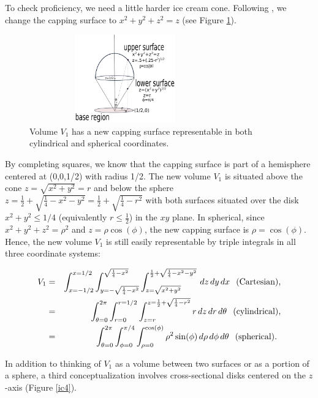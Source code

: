 \documentclass[12pt,fleqn]{article}
\begin{document}
To check proficiency, we need a little harder ice cream cone. Following  \cite{S}, we change the capping surface  to $x^2+y^2+z^2=z$ (see Figure \ref{ic3}).  


\begin{figure}[h]
    \centering
        \includegraphics [width=3.25in, height=1.5in]{ic3.eps}
    \caption{Volume $V_1$ has a new capping surface representable in both cylindrical and spherical coordinates.}
    \label{ic3}
\end{figure}

{\flushleft By} completing squares, we know that the capping surface  is part of a hemisphere centered at (0,0,1/2) with radius 1/2. 
The new volume $V_1$ is situated above the cone  $z=\sqrt{x^2+y^2}=r$ and below the sphere $z=\frac {1}{2}+\sqrt{\frac{1}{4}-x^2-y^2}=\frac{1}{2}+\sqrt{\frac{1}{4}-r^2}$ with both surfaces situated over the disk $x^2+y^2 \le 1/4$ (equivalently $r\le\frac{1}{2}$) in the $xy$ plane.
In spherical, since $x^2+y^2+z^2=\rho^2$ and $z=\rho\cos(\phi)$, the new capping surface is $\rho=\cos(\phi)$. Hence, the new volume $V_1$ is still easily representable by triple integrals in all three coordinate systems:

\begin{eqnarray}
V_1&=& \int_{x=-1/2}^{x=1/2} \int_{y=-\sqrt{\frac{1}{4}-x^2}}^{\sqrt{\frac{1}{4}-x^2}}\int_{z=\sqrt{x^2+y^2}}^{\frac {1}{2}+\sqrt{\frac{1}{4}-x^2-y^2}}\,dz\,dy\,dx \hspace{.1in} \textup{(Cartesian),} \nonumber\\
&=&\int_{\theta=0}^{2\pi}\int_{r=0}^{r=1/2} \int_{z=r}^{z=\frac {1}{2}+\sqrt{\frac{1}{4}-r^2}} r \,dz\,dr\,d\theta \hspace{.1in} \textup{(cylindrical),} \nonumber\\
 &=&\int_{\theta=0}^{2\pi}\int_{\phi=0}^{\pi/4} \int_{\rho=0}^{\cos(\phi)} \rho^2\sin(\phi) \,d\rho\,d\phi\,d\theta \hspace{.1in} \textup{(spherical). \label{eqn1}}
\end{eqnarray}

In addition to thinking of $V_1$ as a volume between two surfaces or as a portion of a sphere, a third conceptualization involves cross-sectional disks centered on the $z$-axis (Figure \ref{ic4}). 
\end{document}
